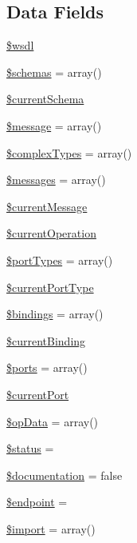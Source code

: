 \subsection*{Data Fields}
\begin{DoxyCompactItemize}
\item 
\hyperlink{classwsdl_a8b3fb8293ad64e3dc0b814fedf24c5dd}{\$wsdl}
\item 
\hyperlink{classwsdl_a99067204780ca14c213a3e15987b7cc1}{\$schemas} = array()
\item 
\hyperlink{classwsdl_af4af684ea50a30d657aeb9682ff0caeb}{\$current\+Schema}
\item 
\hyperlink{classwsdl_abf17cb2dba2ed17cb28aa5f37deb5293}{\$message} = array()
\item 
\hyperlink{classwsdl_acf1dbaf5ad35f659428a61193928b78d}{\$complex\+Types} = array()
\item 
\hyperlink{classwsdl_a21a183f927a6d243fe6b4ba3a6c4d4c8}{\$messages} = array()
\item 
\hyperlink{classwsdl_a04d4e6f80c471063bb6b64c6090c59a2}{\$current\+Message}
\item 
\hyperlink{classwsdl_a44b02f3838b36b3aad2401f0f02d3b76}{\$current\+Operation}
\item 
\hyperlink{classwsdl_aa0affbd30e12dfe2e3d61b716f38cbeb}{\$port\+Types} = array()
\item 
\hyperlink{classwsdl_a87aea97635203239413d2a45c66037e4}{\$current\+Port\+Type}
\item 
\hyperlink{classwsdl_adacdcea57647569304169243ff32cd10}{\$bindings} = array()
\item 
\hyperlink{classwsdl_a473fc9ff0b89502bb265577b54a973c3}{\$current\+Binding}
\item 
\hyperlink{classwsdl_ae5d9eb7d80081176e92db51fbecf2448}{\$ports} = array()
\item 
\hyperlink{classwsdl_a43463e704b29e9e592607bfe91a11bd6}{\$current\+Port}
\item 
\hyperlink{classwsdl_ae44d696522c0c90798bbfe652bc67f0c}{\$op\+Data} = array()
\item 
\hyperlink{classwsdl_a58391ea75f2d29d5d708d7050b641c33}{\$status} = \textquotesingle{}\textquotesingle{}
\item 
\hyperlink{classwsdl_a2c75122f8f6ee14d52c3504f74ab3be9}{\$documentation} = false
\item 
\hyperlink{classwsdl_afb5204f7604df2f50a0058cb0e024875}{\$endpoint} = \textquotesingle{}\textquotesingle{}
\item 
\hyperlink{classwsdl_a268adb9a1f963c9f862f1158e9cfbffd}{\$import} = array()

\end{DoxyCompactItemize}
